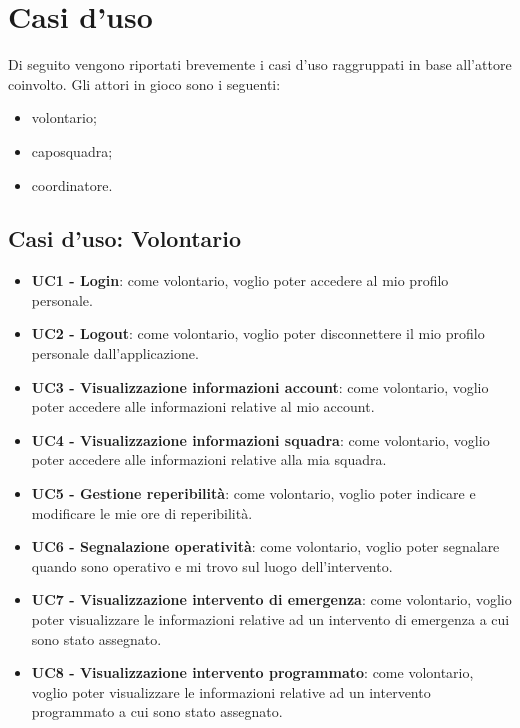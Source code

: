 \section{Casi d'uso}
Di seguito vengono riportati brevemente i casi d'uso raggruppati in base all'attore coinvolto. Gli attori in gioco sono i seguenti:
\begin{itemize}
	\item volontario;
	\item caposquadra;
	\item coordinatore.
\end{itemize}

\subsection{Casi d'uso: Volontario}
\begin{itemize}
	\item \textbf{UC1 - Login}:
	come volontario, voglio poter accedere al mio profilo personale.
	
	\item \textbf{UC2 - Logout}:
	come volontario, voglio poter disconnettere il mio profilo personale dall'applicazione.
	
	\item \textbf{UC3 - Visualizzazione informazioni account}:
	come volontario, voglio poter accedere alle informazioni relative al mio account.
	
	\item \textbf{UC4 - Visualizzazione informazioni squadra}:
	come volontario, voglio poter accedere alle informazioni relative alla mia squadra.
	
	\item \textbf{UC5 - Gestione reperibilità}:
	come volontario, voglio poter indicare e modificare le mie ore di reperibilità.
	
	\item \textbf{UC6 - Segnalazione operatività}:
	come volontario, voglio poter segnalare quando sono operativo e mi trovo sul luogo dell'intervento.
	
	\item \textbf{UC7 - Visualizzazione intervento di emergenza}:
	come volontario, voglio poter visualizzare le informazioni relative ad un intervento di emergenza a cui sono stato assegnato.
	
	\item \textbf{UC8 - Visualizzazione intervento programmato}:
	come volontario, voglio poter visualizzare le informazioni relative ad un intervento programmato a cui sono stato assegnato.
	

\end{itemize}
